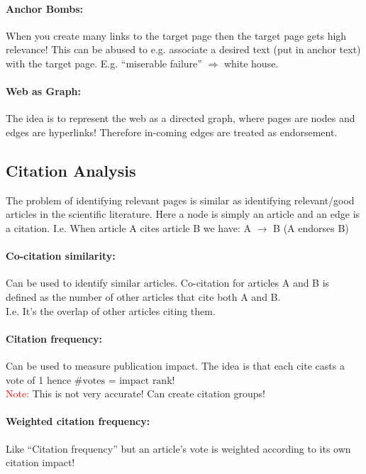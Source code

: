 \documentclass[a4paper,11pt]{article}
\begin{document}
\begin{multicols}{2}
\paragraph{Anchor Bombs:} When you create many links to the target page then the target page gets high relevance! This can be abused to e.g. associate a desired text (put in anchor text) with the target page. E.g. ``miserable failure'' $\Rightarrow$ white house.

\paragraph{Web as Graph:} The idea is to represent the web as a directed graph, where pages are nodes and edges are hyperlinks! Therefore in-coming edges are treated as endorsement. 

\subsection{Citation Analysis} 
The problem of identifying relevant pages is similar as identifying relevant/good articles in the scientific literature. Here a node is simply an article and an edge is a citation. I.e. When article A cites article B we have: A $\rightarrow$ B (A endorses B)

\paragraph{Co-citation similarity:} Can be used to identify similar articles. Co-citation for articles A and B is defined as the number of other articles that cite both A and B.\\
I.e. It's the overlap of other articles citing them.\\ 

\paragraph{Citation frequency:} Can be used to measure publication impact. The idea is that each cite casts a vote of 1 hence $\text{\# votes = impact rank}$! \\
\textcolor{red}{Note:} This is not very accurate! Can create citation groups!\\

\paragraph{Weighted citation frequency:} Like ``Citation frequency'' but an article's vote is weighted according to its own citation impact!


\end{multicols}
\end{document}
